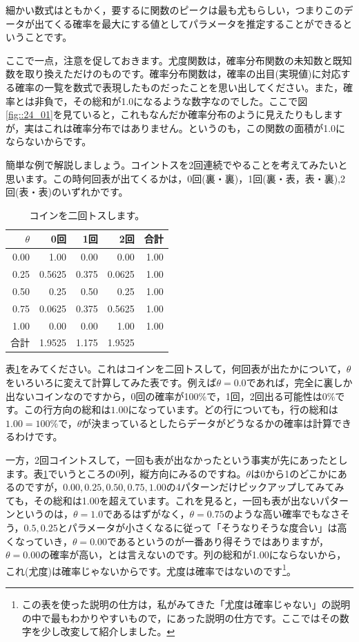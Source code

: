 \documentclass{ltjsarticle}
\begin{document}
細かい数式はともかく，要するに関数のピークは最も尤もらしい，つまりこのデータが出てくる確率を最大にする値としてパラメータを推定することができるということです。

ここで一点，注意を促しておきます。尤度関数は，確率分布関数の未知数と既知数を取り換えただけのものです。確率分布関数は，確率の出目(実現値)に対応する確率の一覧を数式で表現したものだったことを思い出してください。また，確率とは非負で，その総和が1.0になるような数字なのでした。ここで図\ref{fig::24_01}を見ていると，これもなんだか確率分布のように見えたりもしますが，実はこれは確率分布ではありません。というのも，この関数の面積が1.0にならないからです。

簡単な例で解説しましょう。コイントスを2回連続でやることを考えてみたいと思います。この時何回表が出てくるかは，0回(裏・裏)，1回(裏・表，表・裏),2回(表・表)のいずれかです。

\begin{table}[ht]
    \centering
    \caption{コインを二回トスします。} 
    \begin{tabular}{rrrrr}
      \hline
    $\theta$  & 0回 & 1回 & 2回 & 合計 \\
    \hline
    0.00 & 1.00 & 0.00 & 0.00 & 1.00\\
    0.25 & 0.5625 & 0.375 & 0.0625 & 1.00\\
    0.50 & 0.25 & 0.50 & 0.25 & 1.00\\
    0.75 & 0.0625 & 0.375 & 0.5625 & 1.00\\
    1.00 & 0.00 & 0.00 & 1.00 & 1.00\\
    \hline
    合計 & 1.9525 & 1.175 & 1.9525 &  \\
    \hline
    \end{tabular}
      \label{tbl::24_01}
\end{table}

表\ref{tbl::24_01}をみてください。これはコインを二回トスして，何回表が出たかについて，$\theta$をいろいろに変えて計算してみた表です。例えば$\theta=0.0$であれば，完全に裏しか出ないコインなのですから，0回の確率が100\%で，1回，2回出る可能性は0\%です。この行方向の総和は$1.00$になっています。どの行についても，行の総和は$1.00=100\%$で，$\theta$が決まっているとしたらデータがどうなるかの確率は計算できるわけです。

一方，2回コイントスして，一回も表が出なかったという事実が先にあったとします。表\ref{tbl::24_01}でいうところの0列，縦方向にみるのですね。$\theta$は0から1のどこかにあるのですが，$0.00,0.25,0.50,0.75,1.00$の4パターンだけピックアップしてみてみても，その総和は1.00を超えています。これを見ると，一回も表が出ないパターンというのは，$\theta=1.0$であるはずがなく，$\theta=0.75$のような高い確率でもなさそう，$0.5,0.25$とパラメータが小さくなるに従って「そうなりそうな度合い」は高くなっていき，$\theta=0.00$であるというのが一番あり得そうではありますが，$\theta=0.00$の確率が高い，とは言えないのです。列の総和が1.00にならないから，これ(尤度)は確率じゃないからです。尤度は確率ではないのです\footnote{この表を使った説明の仕方は，私がみてきた「尤度は確率じゃない」の説明の中で最もわかりやすいもので，\citet{lambert2018student}にあった説明の仕方です。ここではその数字を少し改変して紹介しました。}。
\end{document}
